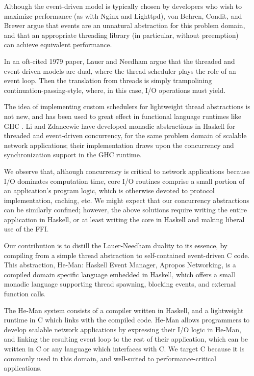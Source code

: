 \documentclass[preprint]{sigplanconf}
\begin{document}
Although the event-driven model is typically chosen by developers who wish to
maximize performance (as with Nginx and Lighttpd), von Behren, Condit, and
Brewer \cite{vonBehrenConditBrewer} argue that events are an unnatural
abstraction for this problem domain, and that an appropriate threading library
(in particular, without preemption) can achieve equivalent performance.

In an oft-cited 1979 paper, Lauer and Needham \cite{LauerNeedham} argue that the
threaded and event-driven models are dual, where the thread scheduler plays the
role of an event loop. Then the translation from threads is simply trampolining
continuation-passing-style, where, in this case, I/O operations must yield.

The idea of implementing custom schedulers for lightweight thread abstractions
is not new, and has been used to great effect in functional language runtimes
like GHC \cite{MarlowEtAl}. Li and Zdancewic \cite{LiZdancewic} have developed
monadic abstractions in Haskell for threaded and event-driven concurrency, for
the same problem domain of scalable network applications; their implementation
draws upon the concurrency and synchronization support in the GHC runtime.

We observe that, although concurrency is critical to network applications
because I/O dominates computation time, core I/O routines comprise a small
portion of an application's program logic, which is otherwise devoted to
protocol implementation, caching, etc. We might expect that our concurrency
abstractions can be similarly confined; however, the above solutions require
writing the entire application in Haskell, or at least writing the core in
Haskell and making liberal use of the FFI.

Our contribution is to distill the Lauer-Needham duality to its essence, by
compiling from a simple thread abstraction to self-contained event-driven C
code. This abstraction, He-Man: Haskell Event Manager, Apropos Networking, is a
compiled domain specific language embedded in Haskell, which offers a small
monadic language supporting thread spawning, blocking events, and external
function calls.

The He-Man system consists of a compiler written in Haskell, and a lightweight
runtime in C which links with the compiled code. He-Man allows programmers to
develop scalable network applications by expressing their I/O logic in He-Man,
and linking the resulting event loop to the rest of their application, which can
be written in C or any language which interfaces with C. We target C because it
is commonly used in this domain, and well-suited to performance-critical
applications.
\end{document}
